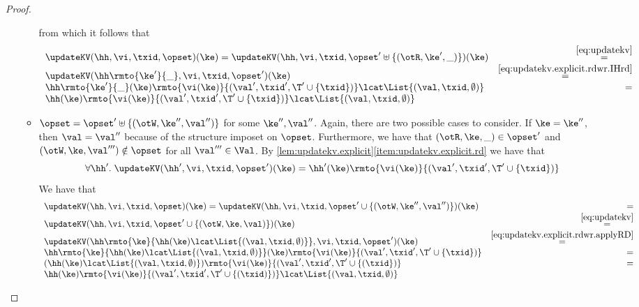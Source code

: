 \begin{proof}
\begin{enumerate}
\begin{itemize}
			from which it follows that 
			\[
			\begin{array}{lr}
			\updateKV(\hh, \vi, \txid, \opset)(\ke) = \updateKV(\hh, \vi, \txid, \opset' \uplus \{(\otR, \ke', \_)\})(\ke) &\stackrel{\eqref{eq:updatekv}}{=}\\
			\updateKV(\hh\rmto{\ke'}{\_}, \vi, \txid, \opset')(\ke) &\stackrel{\eqref{eq:updatekv.explicit.rdwr.IHrd}}{=}\\
			\hh\rmto{\ke'}{\_}(\ke)\rmto{\vi(\ke)}{(\val', \txid', \T' \cup \{\txid\})} \lcat \List{(\val, \txid, \emptyset)} &=\\
			\hh(\ke)\rmto{\vi(\ke)}{(\val', \txid', \T' \cup \{\txid\})} \lcat \List{(\val, \txid, \emptyset)}
			\end{array}
			\]
			
			\item $\opset = \opset' \uplus \{(\otW, \ke'', \val'')\}$ for some $\ke'', \val''$. Again, 
			there are two possible cases to consider. If $\ke = \ke''$, then $\val = \val''$ because of the structure imposet on $\opset$.
			Furthermore, we have that 
			$(\otR, \ke, \_) \in \opset'$ and $(\otW, \ke, \val''') \notin \opset$ for all $\val''' \in \Val$.
			By \cref{lem:updatekv.explicit}\eqref{item:updatekv.explicit.rd} we have that 
			\begin{equation}
			\forall \hh'.\;\updateKV(\hh', \vi, \txid, \opset')(\ke) = \hh'(\ke)\rmto{\vi(\ke)}{(\val', \txid', \T' \cup \{\txid\})}
			\label{eq:updatekv.explicit.rdwr.applyRD}
			\end{equation}
			We have that 
			\[
			\begin{array}{lr}
			\updateKV(\hh,\vi,\txid, \opset)(\ke) = \updateKV(\hh, \vi, \txid, \opset' \cup \{(\otW, \ke'', \val'')\})(\ke) &= \\
			\updateKV(\hh,\vi, \txid, \opset' \cup \{(\otW, \ke, \val)\})(\ke) &\stackrel{\eqref{eq:updatekv}}{=}\\
			\updateKV(\hh\rmto{\ke}{\hh(\ke) \lcat \List{(\val, \txid, \emptyset)}}, \vi, \txid, \opset')(\ke) &\stackrel{\eqref{eq:updatekv.explicit.rdwr.applyRD}}{=}\\
			\hh\rmto{\ke}{\hh(\ke) \lcat \List{(\val, \txid, \emptyset)}}(\ke)\rmto{\vi(\ke)}{(\val', \txid', \T' \cup \{\txid\})} &=\\
			(\hh(\ke) \lcat\List{(\val, \txid, \emptyset)})\rmto{\vi(\ke)}{(\val', \txid', \T' \cup \{(\txid\})} &=\\
			\hh(\ke)\rmto{\vi(\ke)}{(\val',\txid', \T' \cup \{(\txid)\})} \lcat \List{(\val, \txid, \emptyset)}
			\end{array}
\]
\end{itemize}
\end{enumerate}
\end{proof}
